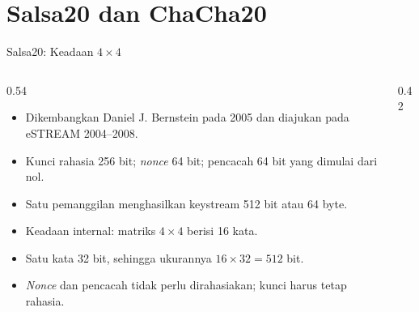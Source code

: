 \documentclass[aspectratio=169,11pt]{beamer}
\begin{document}
\section{Salsa20 dan ChaCha20}

\begin{frame}{Salsa20: Keadaan $4\times4$}
    \footnotesize
    \begin{columns}[T,onlytextwidth]
        \begin{column}{0.54\textwidth}
            \begin{itemize}
                \item Dikembangkan Daniel J. Bernstein pada 2005 dan
                      diajukan pada eSTREAM 2004--2008.
                \item Kunci rahasia 256 bit; \textit{nonce} 64 bit; pencacah
                      64 bit yang dimulai dari nol.
                \item Satu pemanggilan menghasilkan keystream 512 bit
                      atau 64 byte.
                \item Keadaan internal: matriks $4\times4$ berisi 16 kata.
                \item Satu kata 32 bit, sehingga ukurannya
                      $16\times32=512$ bit.
                \item \textit{Nonce} dan pencacah tidak perlu dirahasiakan;
                      kunci harus tetap rahasia.
            \end{itemize}
        \end{column}
        \begin{column}{0.42\textwidth}
            \centering
        \end{column}
    \end{columns}
\end{frame}
\end{document}
